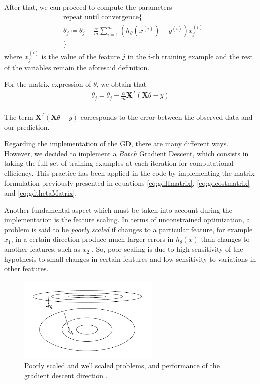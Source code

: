 \documentclass[a4paper, report, oneside, UKenglish]{memoir}
\begin{document}
After that, we can proceed to compute the parameters
\begin{equation}\label{eq:gdtheta}
\begin{split}
    &\mbox{repeat until convergence}\{\\
    &\theta_{j} \coloneqq \theta_{j} - \frac{\alpha}{m} \sum\limits_{i=1}^{m}(h_{\theta}(x^{(i)}) -  y^{(i)})x_{j}^{(i)}\\
&\}
\end{split}
\end{equation}
where $x_{j}^{(i)}$ is the value of the feature $j$ in the $i$-th training example and the rest of the variables remain the aforesaid definition. 

For the matrix expression of $\theta$, we obtain that
\begin{equation}\label{eq:gdthetaMatrix}
\begin{split}
    \theta_{j} = \theta_{j} - \frac{\alpha}{m}\textbf{X}^T(\textbf{X}\theta - y)\\
\end{split}
\end{equation}

The term $\textbf{X}^T(\textbf{X}\theta - y)$ corresponds to the error between the observed data and our prediction.

Regarding the implementation of the GD, there are many different ways. However, we decided to implement a \textit{Batch} Gradient Descent, which consists in taking the full set of training examples at each iteration for computational efficiency. This practice has been applied in the code by implementing the matrix formulation previously presented in equations \eqref{eq:gdHmatrix}, \eqref{eq:gdcostmatrix} and \eqref{eq:gdthetaMatrix}.

Another fundamental aspect which must be taken into account during the implementation is the feature scaling. In terms of unconstrained optimization, a problem is said to be \textit{poorly scaled} if changes to a particular feature, for example $x_{1}$, in a certain direction produce much larger errors in $h_\theta(x)$ than changes to another features, such as $x_{2}$ \cite{numericalopt}. So, poor scaling is due to high sensitivity of the hypothesis to small changes in certain features and low sensitivity to variations in other features. 

\begin{figure}[hbt]
    \centering
    \includegraphics[width=0.6\textwidth]{fitting/PoorScaling_GradDesc.PNG}
    \caption{Poorly scaled and well scaled problems, and performance of the gradient descent direction \cite{numericalopt}.}
    \label{fig:scaling_gd}
\end{figure}
\end{document}
